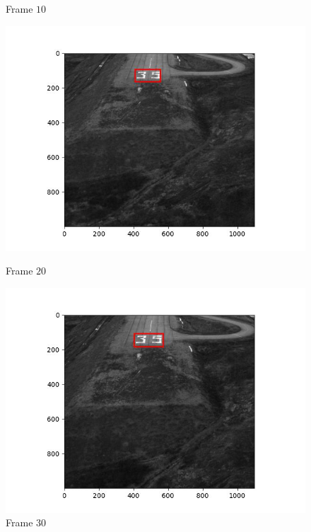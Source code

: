 \begin{figure}[H]
\begin{minipage}{.49\textwidth}
    \caption{Frame $10$}
  \end{minipage}
  \hfill
  \begin{minipage}{.49\textwidth}
    \centering
    \includegraphics[width=\textwidth]{./figures/lk_affine/landing/frame000020.jpg}
    \caption{Frame $20$}
  \end{minipage}
  \begin{minipage}{.49\textwidth}
    \centering
    \includegraphics[width=\textwidth]{./figures/lk_affine/landing/frame000030.jpg}
    \caption{Frame $30$}
  \end{minipage}
  \hfill
  \begin{minipage}{.49\textwidth}
    \centering

\end{minipage}
\end{figure}
